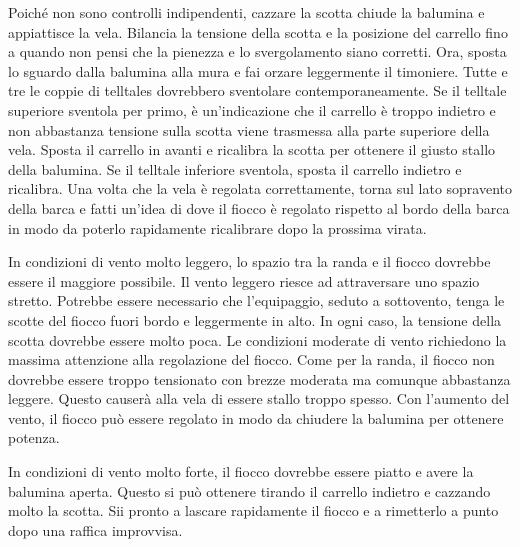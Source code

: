 Poiché non sono controlli indipendenti,
cazzare la scotta chiude la balumina e appiattisce la vela. Bilancia la tensione
della scotta e la posizione del carrello fino a quando non pensi che la pienezza
e lo svergolamento siano corretti. Ora, sposta lo sguardo dalla balumina alla
mura e fai orzare leggermente il timoniere. Tutte e tre le coppie di telltales
dovrebbero sventolare contemporaneamente. Se il telltale superiore sventola per
primo, è un'indicazione che il carrello è troppo indietro e non abbastanza
tensione sulla scotta viene trasmessa alla parte superiore della vela. Sposta il
carrello in avanti e ricalibra la scotta per ottenere il giusto stallo della
balumina. Se il telltale inferiore sventola, sposta il carrello indietro e
ricalibra. Una volta che la vela è regolata correttamente, torna sul lato
sopravento della barca e fatti un'idea di dove il fiocco è regolato rispetto al
bordo della barca in modo da poterlo rapidamente ricalibrare dopo la prossima
virata. 

In condizioni di vento molto leggero, lo spazio tra la randa e il fiocco dovrebbe
essere il maggiore possibile. Il vento leggero riesce ad attraversare uno spazio
stretto. Potrebbe essere necessario che l'equipaggio, seduto a sottovento, tenga
le scotte del fiocco fuori bordo e leggermente in alto. In ogni caso, la
tensione della scotta dovrebbe essere molto poca. Le condizioni moderate di vento
richiedono la massima attenzione alla regolazione del fiocco. Come per la randa,
il fiocco non dovrebbe essere troppo tensionato con brezze moderata ma comunque
abbastanza leggere. Questo causerà alla vela di essere stallo troppo spesso. Con
l'aumento del vento, il fiocco può essere regolato in modo da chiudere la
balumina per ottenere potenza. 

In condizioni di vento molto forte, il fiocco
dovrebbe essere piatto e avere la balumina aperta. Questo si può ottenere
tirando il carrello indietro e
cazzando molto la scotta. Sii pronto a lascare rapidamente il fiocco
e a rimetterlo a punto dopo una raffica improvvisa. 